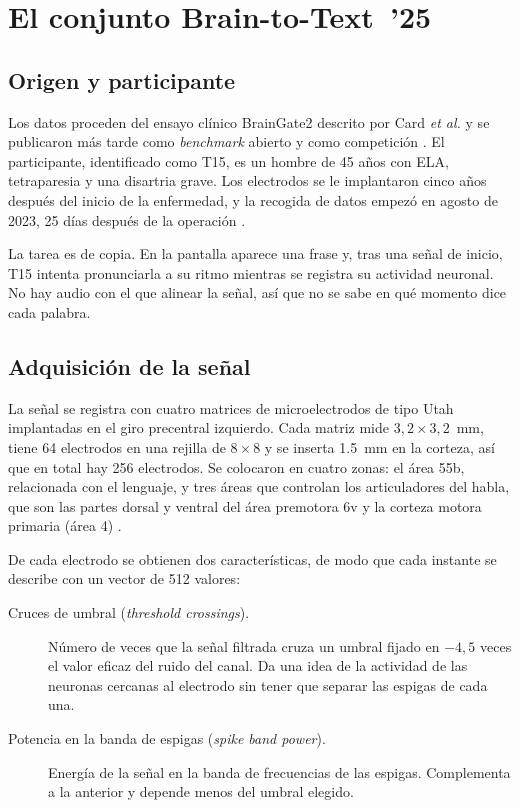 \section{El conjunto Brain-to-Text~'25}
\label{sec:b2t25}

\subsection{Origen y participante}

Los datos proceden del ensayo clínico BrainGate2 descrito por Card \textit{et al.} \cite{card2024} y se publicaron más tarde como \textit{benchmark} abierto y como competición \cite{b2t25}. El participante, identificado como T15, es un hombre de 45 años con ELA, tetraparesia y una disartria grave. Los electrodos se le implantaron cinco años después del inicio de la enfermedad, y la recogida de datos empezó en agosto de 2023, 25 días después de la operación \cite{card2024}.

La tarea es de copia. En la pantalla aparece una frase y, tras una señal de inicio, T15 intenta pronunciarla a su ritmo mientras se registra su actividad neuronal. No hay audio con el que alinear la señal,  así que no se sabe en qué momento dice cada palabra.

\subsection{Adquisición de la señal}

La señal se registra con cuatro matrices de microelectrodos de tipo Utah implantadas en el giro precentral izquierdo. Cada matriz mide $3{,}2 \times 3{,}2$~\si{\milli\metre}, tiene 64 electrodos en una rejilla de $8 \times 8$ y se inserta \SI{1.5}{\milli\metre} en la corteza, así que en total hay 256 electrodos. Se colocaron en cuatro zonas: el área 55b, relacionada con el lenguaje, y tres áreas que controlan los articuladores del habla, que son las partes dorsal y ventral del área premotora 6v y la corteza motora primaria (área 4) \cite{card2024}.

De cada electrodo se obtienen dos características, de modo que cada instante se describe con un vector de 512 valores:

\begin{description}
  \item[Cruces de umbral (\textit{threshold crossings}).] Número de veces que la señal filtrada cruza un umbral fijado en $-4{,}5$ veces el valor eficaz del ruido del canal. Da una idea de la actividad de las neuronas cercanas al electrodo sin tener que separar las espigas de cada una.
  \item[Potencia en la banda de espigas (\textit{spike band power}).] Energía de la señal en la banda de frecuencias de las espigas. Complementa a la anterior y depende menos del umbral elegido.
\end{description}

